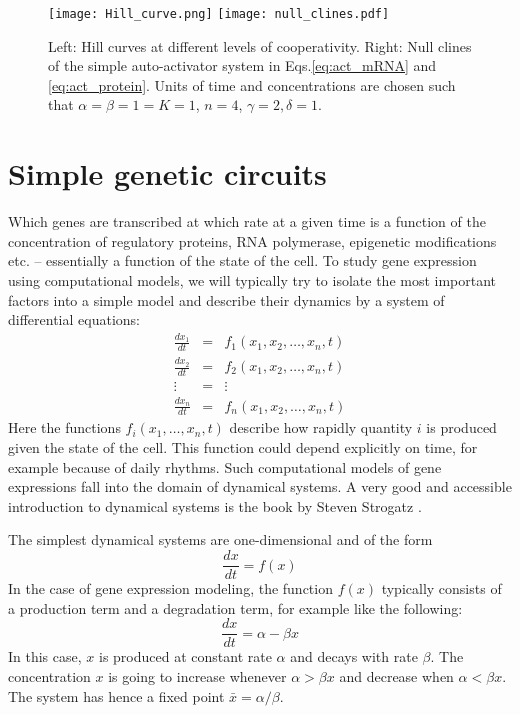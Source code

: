 \begin{figure}[tb]
	\centering
	\texttt{[image: Hill\_curve.png]}
	\texttt{[image: null\_clines.pdf]}
	\caption{Left: Hill curves at different levels of cooperativity.
			Right: Null clines of the simple auto-activator system in Eqs.\ref{eq:act_mRNA} and \ref{eq:act_protein}. Units of time and concentrations are chosen such that $\alpha=\beta=1=K=1$, $n=4$, $\gamma=2, \delta=1$.}
	\label{fig:hill}
	\label{fig:null_clines}
\end{figure}


\section{Simple genetic circuits}
Which genes are transcribed at which rate at a given time is a function of the concentration of regulatory proteins, RNA polymerase, epigenetic modifications etc. -- essentially a function of the state of the cell.
To study gene expression using computational models, we will typically try to isolate the most important factors into a simple model and describe their dynamics by a system of differential equations:
\begin{eqnarray}
	\frac{d x_1}{dt} &=& f_1(x_1, x_2, \ldots, x_n, t) \\
	\frac{d x_2}{dt} &=& f_2(x_1, x_2, \ldots, x_n, t) \\
	\vdots & = & \vdots \\
	\frac{d x_n}{dt} &=& f_n(x_1, x_2, \ldots, x_n, t)
\end{eqnarray}
Here the functions $f_i(x_1,\ldots, x_n,t)$ describe how rapidly quantity $i$ is produced given the state of the cell.
This function could depend explicitly on time, for example because of daily rhythms.
Such computational models of gene expressions fall into the domain of dynamical systems.
A very good and accessible introduction to dynamical systems is the book by Steven Strogatz \citep{strogatz_nonlinear_2014}.

The simplest dynamical systems are one-dimensional and of the form
\begin{equation}
	\frac{dx}{dt} = f(x)
\end{equation}
In the case of gene expression modeling, the function $f(x)$ typically consists of a production term and a degradation term, for example like the following:
\begin{equation}
	\frac{dx}{dt} = \alpha - \beta x
\end{equation}
In this case, $x$ is produced at constant rate $\alpha$ and decays with rate $\beta$.
The concentration $x$ is going to increase whenever $\alpha > \beta x$ and decrease when $\alpha <\beta x$.
The system has hence a fixed point $\bar{x} = \alpha/\beta$.

